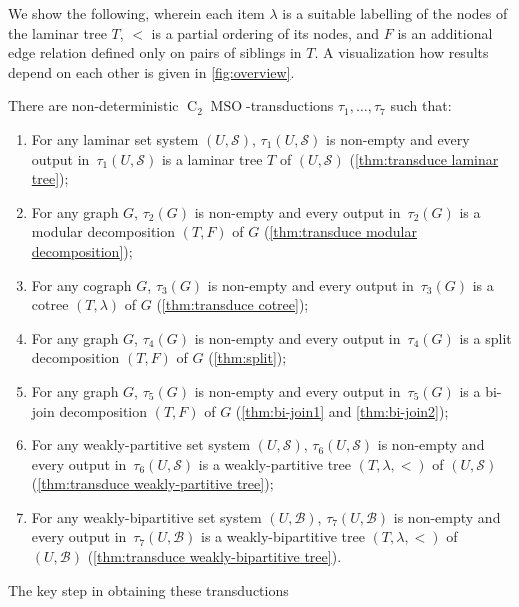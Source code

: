 \documentclass{lmcs} %
\newcommand{\MSO}{\ensuremath{\operatorname{MSO}}\xspace}
\newcommand{\CMSO}[1][]{\ensuremath{\C[#1]{\!\!}\MSO}\xspace}
\newcommand{\C}[1][]{\ensuremath{\operatorname{C}_{#1}}\xspace}
\begin{document}
We show the following, wherein each item $\lambda$ is a suitable labelling of the nodes of the laminar tree $T$, $<$ is a partial ordering of its nodes, and $F$ is an additional edge relation defined only on pairs of siblings in $T$. A visualization how results depend on each other is given in \autoref{fig:overview}.

\begin{thm}\label{thm:summary}
    There are non-deterministic \CMSO[2]-transductions $\tau_1,\ldots,\tau_7$ such that: 
    \begin{enumerate}
        \item 
           For any laminar set system $(U,\mathcal{S})$, $\tau_1(U, \mathcal{S})$ is non-empty
           and every output in~$\tau_1(U, \mathcal{S})$ is a laminar tree $T$ of $(U,\mathcal{S})$ (\autoref{thm:transduce laminar tree});
        \item 
            For any graph $G$, $\tau_2(G)$ is non-empty
            and every output in~$\tau_2(G)$ is a modular decomposition $(T,F)$ of $G$ (\autoref{thm:transduce modular decomposition});
        \item 
            For any cograph $G$, $\tau_3(G)$ is non-empty
            and every output in~$\tau_3(G)$ is a cotree $(T,\lambda)$ of $G$ (\autoref{thm:transduce cotree});
        \item 
             For any graph $G$, $\tau_4(G)$ is non-empty
             and every output in~$\tau_4(G)$ is a split decomposition $(T,F)$ of $G$ (\autoref{thm:split});
        \item 
             For any graph $G$, $\tau_5(G)$ is non-empty
             and every output in~$\tau_5(G)$ is a bi-join decomposition $(T,F)$ of $G$ (\autoref{thm:bi-join1} and \autoref{thm:bi-join2});
        \item 
            For any weakly-partitive set system $(U,\mathcal{S})$, $\tau_6(U,\mathcal{S})$ is non-empty
            and every output in~$\tau_6(U,\mathcal{S})$ is a weakly-partitive tree $(T,\lambda,<)$ of $(U,\mathcal{S})$ (\autoref{thm:transduce weakly-partitive tree});
        \item 
            For any weakly-bipartitive set system $(U,\mathcal{B})$, $\tau_7(U,\mathcal{B})$ is non-empty
            and every output in~$\tau_7(U,\mathcal{B})$ is a weakly-bipartitive tree $(T,\lambda,<)$ of $(U,\mathcal{B})$ (\autoref{thm:transduce weakly-bipartitive tree}).
    \end{enumerate}
\end{thm}
The key step in obtaining these transductions
\end{document}
